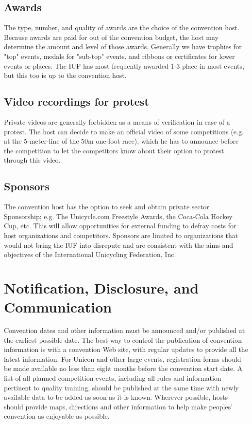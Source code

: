 \subsection{Awards}
The type, number, and quality of awards are the choice of the convention host. 
Because awards are paid for out of the convention budget, the host may determine the amount and level of those awards. 
Generally we have trophies for "top" events, medals for "sub-top" events, and ribbons or certificates for lower events or places. 
The IUF has most frequently awarded 1-3 place in most events, but this too is up to the convention host.

\subsection{Video recordings for protest}
Private videos are generally forbidden as a means of verification in case of a protest. 
The host can decide to make an official video of some competitions (e.g. at the 5-meter-line of the 50m one-foot race), which he has to announce before the competition to let the competitors know about their option to protest through this video.

\subsection{Sponsors}
The convention host has the option to seek and obtain private sector Sponsorship; e.g. The Unicycle.com Freestyle Awards, the Coca-Cola Hockey Cup, etc. 
This will allow opportunities for external funding to defray costs for host organizations and competitors. 
Sponsors are limited to organizations that would not bring the IUF into disrepute and are consistent with the aims and objectives of the International Unicycling Federation, Inc.

\section{Notification, Disclosure, and Communication}
Convention dates and other information must be announced and/or published at the earliest possible date. 
The best way to control the publication of convention information is with a convention Web site, with regular updates to provide all the latest information. 
For Unicon and other large events, registration forms should be made available no less than eight months before the convention start date. 
A list of all planned competition events, including all rules and information pertinent to quality training, should be published at the same time with newly available data to be added as soon as it is known. 
Wherever possible, hosts should provide maps, directions and other information to help make peoples' convention as enjoyable as possible.

